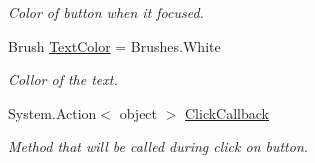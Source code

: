 \begin{DoxyCompactItemize}
\begin{DoxyCompactList}\small\item\em Color of button when it focused. \end{DoxyCompactList}\item 
Brush \mbox{\hyperlink{class_teacher_handbook_1_1_controls_1_1_catalog_button_ad9f4d0665c824c892cfcdb5c71031328}{Text\+Color}} = Brushes.\+White
\begin{DoxyCompactList}\small\item\em Collor of the text. \end{DoxyCompactList}\item 
System.\+Action$<$ object $>$ \mbox{\hyperlink{class_teacher_handbook_1_1_controls_1_1_catalog_button_afeb6f1ef9c37714972b7678d76e2f45a}{Click\+Callback}}
\begin{DoxyCompactList}\small\item\em Method that will be called during click on button. \end{DoxyCompactList}\end{DoxyCompactItemize}
